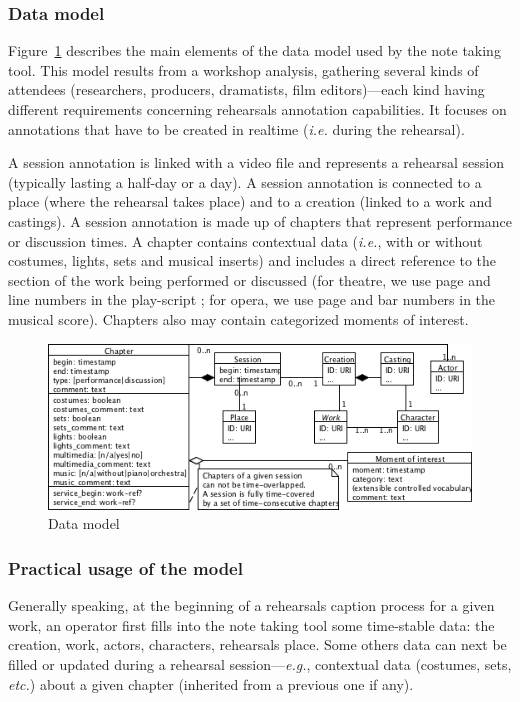 \documentclass[conference]{IEEEtran}
\newcommand{\todo}[1]{\noindent\textcolor{red}{{\bf \{ToDo} #1{\bf \}}}}
\begin{document}
\subsubsection{Data model} Figure~\ref{fig_data_model} describes the main elements of the data model used by the note taking tool. This model results from a workshop analysis, gathering several kinds of attendees (researchers, producers, dramatists, film editors)---each kind having different requirements concerning rehearsals annotation capabilities. It focuses on annotations that have to be created in realtime (\emph{i.e.} during the rehearsal). \newline

A session annotation is linked with a video file and represents a rehearsal session (typically lasting a half-day or a day). A session annotation is connected to a place (where the rehearsal takes place) and to a creation (linked to a work and castings). A session annotation is made up of chapters that represent performance or discussion times. A chapter contains contextual data (\emph{i.e.}, with or without costumes, lights, sets and musical inserts) and includes a direct reference to the section of the work being performed or discussed (for theatre, we use page and line numbers in the play-script ; for opera, we use page and bar numbers in the musical score). Chapters also may contain categorized moments of interest. 


\begin{figure}[ht]
\centering
{
\includegraphics[width=0.8\linewidth]{UMLet_Data_model}
\caption{Data model}
\label{fig_data_model}
}
\end{figure}


\subsubsection{Practical usage of the model} Generally speaking, at the beginning of a rehearsals caption process for a given work, an operator first fills into the note taking tool some time-stable data: the creation, work, actors, characters, rehearsals place. Some others data can next be filled or updated during a rehearsal session---\emph{e.g.}, contextual data (costumes, sets, \emph{etc.}) about a given chapter (inherited from a previous one if any).
\end{document}
